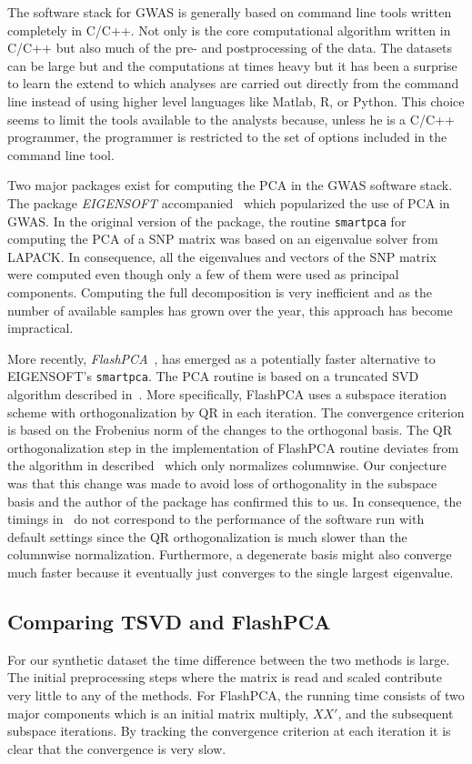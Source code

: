 \documentclass[final,leqno]{siamltex1213}
\begin{document}
The software stack for GWAS is generally based on command line tools written completely in C/C++. Not only is the core computational algorithm written in C/C++ but also much of the pre- and postprocessing of the data. The datasets can be large but and the computations at times heavy but it has been a surprise to learn the extend to which analyses are carried out directly from the command line instead of using higher level languages like Matlab, R, or Python. This choice seems to limit the tools available to the analysts because, unless he is a C/C++ programmer, the programmer is restricted to the set of options included in the command line tool.

Two major packages exist for computing the PCA in the GWAS software stack. The package \emph{EIGENSOFT} accompanied~\cite{patterson2006population} which popularized the use of PCA in GWAS. In the original version of the package, the routine \texttt{smartpca} for computing the PCA of a SNP matrix was based on an eigenvalue solver from LAPACK. In consequence, all the eigenvalues and vectors of the SNP matrix were computed even though only a few of them were used as principal components. Computing the full decomposition is very inefficient and as the number of available samples has grown over the year, this approach has become impractical.

More recently, \emph{FlashPCA}~\cite{abraham2014fast}, has emerged as a potentially faster alternative to EIGENSOFT's \texttt{smartpca}. The PCA routine is based on a truncated SVD algorithm described in~\cite{halko2011finding}. More specifically, FlashPCA uses a subspace iteration scheme with orthogonalization by QR in each iteration. The convergence criterion is based on the Frobenius norm of the changes to the orthogonal basis. The QR orthogonalization step in the implementation of FlashPCA routine deviates from the algorithm in described~\cite{abraham2014fast} which only normalizes columnwise. Our conjecture was that this change was made to avoid loss of orthogonality in the subspace basis and the author of the package has confirmed this to us. In consequence, the timings in~\cite{abraham2014fast} do not correspond to the performance of the software run with default settings since the QR orthogonalization is much slower than the columnwise normalization. Furthermore, a degenerate basis might also converge much faster because it eventually just converges to the single largest eigenvalue.

\subsection{Comparing TSVD and FlashPCA}
For our synthetic dataset the time difference between the two methods is large. The initial preprocessing steps where the matrix is read and scaled contribute very little to any of the methods. For FlashPCA, the running time consists of two major components which is an initial matrix multiply, $XX'$, and the subsequent subspace iterations. By tracking the convergence criterion at each iteration it is clear that the convergence is very slow.
\end{document}
